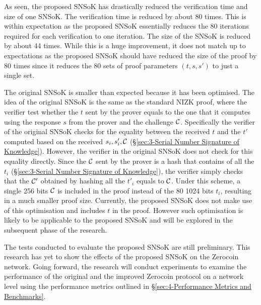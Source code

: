 As seen, the proposed SNSoK has drastically reduced the verification time and size of one SNSoK. The verification time is reduced by about 80 times. This is within expectation as the proposed SNSoK essentially reduces the 80 iterations required for each verification to one iteration. The size of the SNSoK is reduced by about 44 times. While this is a huge improvement, it does not match up to expectations as the proposed SNSoK should have reduced the size of the proof by 80 times since it reduces the 80 sets of proof parameters $(t,s,s')$ to just a single set. 

The original SNSoK is smaller than expected because it has been optimised. The idea of the original SNSoK is the same as the standard NIZK proof, where the verifier test whether the $t$ sent by the prover equals to the one that it computes using the response $s$ from the prover and the challenge $\mathcal{C}$. Specifically the verifier of the original SNSoK checks for the equality between the received $t$ and the $t'$ computed based on the received $s_i,s'_i,\mathcal{C}$ (\S\ref{sec:3-Serial Number Signature of Knowledge}). However, the verifier in the original SNSoK does not check for this equality directly. Since the $\mathcal{C}$ sent by the prover is a hash that contains of all the $t_i$ (\S\ref{sec:3-Serial Number Signature of Knowledge}), the verifier simply checks that the $\mathcal{C}'$ obtained by hashing all the $t'_i$ equals to $\mathcal{C}$. Under this scheme, a single 256 bits $\mathcal{C}$ is included in the proof instead of the 80 1024 bits $t_i$, resulting in a much smaller proof size. Currently, the proposed SNSoK does not make use of this optimisation and includes $t$ in the proof. However such optimisation is likely to be applicable to the proposed SNSoK and will be explored in the subsequent phase of the research. 

The tests conducted to evaluate the proposed SNSoK are still preliminary. This research has yet to show the effects of the proposed SNSoK on the Zerocoin network. Going forward, the research will conduct experiments to examine the performance of the original and the improved Zerocoin protocol on a network level using the performance metrics outlined in \S\ref{sec:4-Performance Metrics and Benchmarks}.
